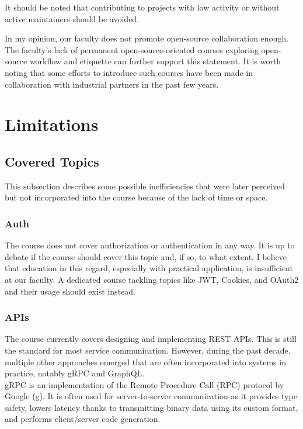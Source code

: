 \documentclass[
  digital,
  color,
  oneside,
  nosansbold,
  nocolorbold,
  lof,
  lot,
]{fithesis4}
\begin{document}
It should be noted that contributing to projects with low activity or without active maintainers should be avoided.

In my opinion, our faculty does not promote open-source collaboration enough. The faculty's lack of permanent open-source-oriented courses exploring open-source workflow and etiquette can further support this statement. It is worth noting that some efforts to introduce such courses have been made in collaboration with industrial partners in the past few years.

\section{Limitations}

\subsection{Covered Topics}

This subsection describes some possible inefficiencies that were later perceived but not incorporated into the course because of the lack of time or space.

\subsubsection{Auth}

The course does not cover authorization or authentication in any way. It is up to debate if the course should cover this topic and, if so, to what extent. I believe that education in this regard, especially with practical application, is insufficient at our faculty. A dedicated course tackling topics like JWT, Cookies, and OAuth2 and their usage should exist instead.

\subsubsection{APIs}

The course currently covers designing and implementing REST APIs. This is still the standard for most service communication. However, during the past decade, multiple other approaches emerged that are often incorporated into systems in practice, notably gRPC and GraphQL. \\

gRPC is an implementation of the Remote Procedure Call (RPC) protocol by Google (g). It is often used for server-to-server communication as it provides type safety, lowers latency thanks to transmitting binary data using its custom format, and performs client/server code generation. \\
\end{document}
